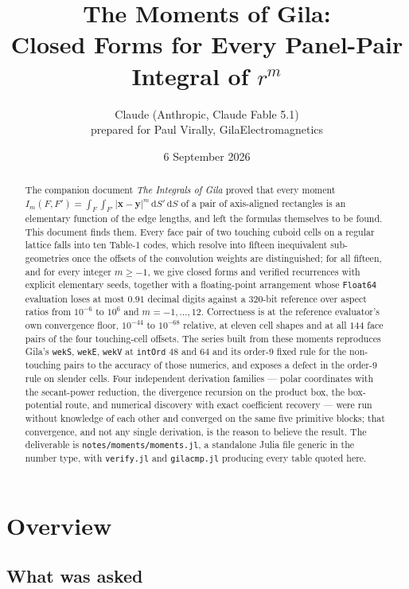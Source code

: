\documentclass[11pt]{article}
\title{The Moments of Gila:\\ Closed Forms for Every Panel-Pair Integral of $r^{m}$}
\author{Claude (Anthropic, Claude Fable 5.1)\\[2pt]\small prepared for Paul Virally, GilaElectromagnetics}
\date{6 September 2026}
\theoremstyle{remark}
\newcommand{\dd}{\mathrm{d}}
\newcommand{\code}[1]{\texttt{#1}}
\begin{document}
\maketitle

\begin{abstract}
The companion document \emph{The Integrals of Gila} proved that every moment
$I_m(F,F') = \int_F\int_{F'}|\mathbf{x}-\mathbf{y}|^m\,\dd S'\,\dd S$ of a pair of
axis-aligned rectangles is an elementary function of the edge lengths, and left the
formulas themselves to be found. This document finds them. Every face pair of two
touching cuboid cells on a regular lattice falls into ten Table-1 codes, which resolve
into fifteen inequivalent sub-geometries once the offsets of the convolution weights are
distinguished; for all fifteen, and for every integer $m\ge -1$, we give closed forms and
verified recurrences with explicit elementary seeds, together with a floating-point
arrangement whose \code{Float64} evaluation loses at most $0.91$ decimal digits against a
$320$-bit reference over aspect ratios from $10^{-6}$ to $10^{6}$ and $m = -1,\ldots,12$.
Correctness is at the reference evaluator's own convergence floor, $10^{-44}$ to
$10^{-68}$ relative, at eleven cell shapes and at all $144$ face pairs of the four
touching-cell offsets. The series built from these moments reproduces Gila's
\code{wekS}, \code{wekE}, \code{wekV} at \code{intOrd} $48$ and $64$ and its order-9 fixed
rule for the non-touching pairs to the accuracy of those numerics, and exposes a defect in
the order-9 rule on slender cells. Four independent derivation families --- polar
coordinates with the secant-power reduction, the divergence recursion on the product box,
the box-potential route, and numerical discovery with exact coefficient recovery --- were
run without knowledge of each other and converged on the same five primitive blocks;
that convergence, and not any single derivation, is the reason to believe the result. The
deliverable is \code{notes/moments/moments.jl}, a standalone Julia file generic in the
number type, with \code{verify.jl} and \code{gilacmp.jl} producing every table quoted here.
\end{abstract}

\tableofcontents

\section{Overview}
\label{sec:over}

\subsection{What was asked}
\end{document}
